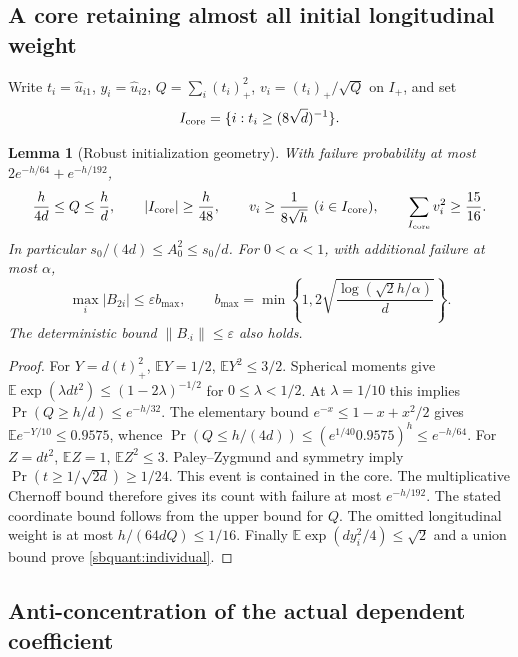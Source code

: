 \documentclass{article} %
\theoremstyle{plain}
\newtheorem{lemma}[theorem]{Lemma}
\theoremstyle{definition}
\theoremstyle{remark}
\begin{document}
\subsection{A core retaining almost all initial longitudinal weight}

Write $t_i=\widehat u_{i1}$, $y_i=\widehat u_{i2}$,
$Q=\sum_i(t_i)_+^2$, $v_i=(t_i)_+/\sqrt Q$ on $I_+$, and set
\[
 I_{\rm core}=\{i:t_i\ge(8\sqrt d)^{-1}\}.
\]
\begin{lemma}[Robust initialization geometry]\label{sbquant:core}
With failure probability at most $2e^{-h/64}+e^{-h/192}$,
\begin{equation}\label{sbquant:core-event}
 \frac{h}{4d}\le Q\le\frac hd,\qquad
 |I_{\rm core}|\ge\frac h{48},\qquad
 v_i\ge\frac1{8\sqrt h}\ (i\in I_{\rm core}),\qquad
 \sum_{I_{\rm core}}v_i^2\ge\frac{15}{16}.
\end{equation}
In particular $s_0/(4d)\le A_0^2\le s_0/d$.
For $0<\alpha<1$, with additional failure at most $\alpha$,
\begin{equation}\label{sbquant:individual}
 \max_i|B_{2i}|\le\varepsilon b_{\max},\qquad
 b_{\max}=\min\left\{1,
 2\sqrt{\frac{\log(\sqrt2h/\alpha)}d}\right\}.
\end{equation}
The deterministic bound $\|B_{\cdot i}\|\le\varepsilon$ also holds.
\end{lemma}
\begin{proof}
For $Y=d(t)_+^2$, $\mathbb EY=1/2$, $\mathbb EY^2\le3/2$.
Spherical moments give
$\mathbb E\exp(\lambda d t^2)\le(1-2\lambda)^{-1/2}$ for
$0\le\lambda<1/2$. At $\lambda=1/10$ this implies
$\Pr(Q\ge h/d)\le e^{-h/32}$.
The elementary bound $e^{-x}\le1-x+x^2/2$ gives
$\mathbb Ee^{-Y/10}\le0.9575$, whence
$\Pr(Q\le h/(4d))\le(e^{1/40}0.9575)^h\le e^{-h/64}$.
For $Z=dt^2$, $\mathbb EZ=1$, $\mathbb EZ^2\le3$.
Paley--Zygmund and symmetry imply
$\Pr(t\ge1/\sqrt{2d})\ge1/24$.
This event is contained in the core. The multiplicative Chernoff bound
therefore gives its count with failure at most $e^{-h/192}$.
The stated coordinate bound follows from the upper bound for $Q$.
The omitted longitudinal weight is at most
$h/(64dQ)\le1/16$. Finally
$\mathbb E\exp(dy_i^2/4)\le\sqrt2$ and a union bound prove
\eqref{sbquant:individual}.
\end{proof}

\subsection{Anti-concentration of the actual dependent coefficient}
\end{document}

